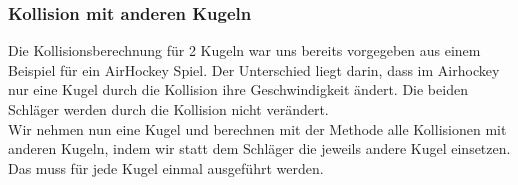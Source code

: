 	\subsubsection{Kollision mit anderen Kugeln}
		Die Kollisionsberechnung für 2 Kugeln war uns bereits vorgegeben aus einem Beispiel für ein AirHockey Spiel. 
		Der Unterschied liegt darin, dass im Airhockey nur eine Kugel durch die Kollision ihre Geschwindigkeit ändert. Die beiden Schläger werden durch die Kollision nicht verändert. \\  
		Wir nehmen nun eine Kugel und berechnen mit der Methode alle Kollisionen mit anderen Kugeln, indem wir statt dem Schläger die jeweils andere Kugel einsetzen. Das muss für jede Kugel einmal ausgeführt werden.  \\
		

